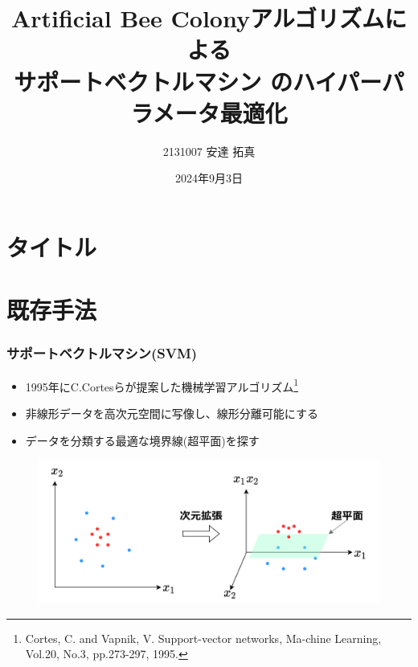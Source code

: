 \documentclass[11pt,dvipdfmx,cjk]{beamer}
\title{Artificial Bee Colonyアルゴリズムによる\\サポートベクトルマシン
のハイパーパラメータ最適化}
\author{2131007 安達 拓真}
\institute{千葉工業大学 情報科学部 情報工学科 4年 山口研究室}
\date{2024年9月3日}
\begin{document}

\section{タイトル}
\begin{frame}
\maketitle
\end{frame}

\section{既存手法} %
\begin{frame}
\frametitle{サポートベクトルマシン(SVM)}
\begin{itemize}
    \item 1995年にC.Cortesらが提案した機械学習アルゴリズム\footnote{ Cortes, C. and Vapnik, V. Support-vector networks, Ma-chine Learning, Vol.20, No.3, pp.273-297, 1995.}
    \item 非線形データを高次元空間に写像し、線形分離可能にする 
    \item データを分類する最適な境界線(超平面)を探す                
  \end{itemize}
  \begin{figure}
    \centering
    \includegraphics[width=0.8\linewidth]{syazou.png}
   \end{figure}
\end{frame}
\end{document}
